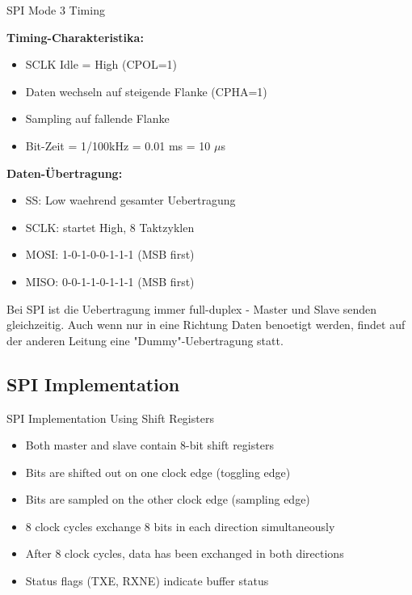 \begin{example2}{SPI Mode 3 Timing}
    \begin{minipage}{0.5\linewidth}
        \textbf{Timing-Charakteristika:}
    \begin{itemize}
        \item SCLK Idle = High (CPOL=1)
        \item Daten wechseln auf steigende Flanke (CPHA=1)
        \item Sampling auf fallende Flanke
        \item Bit-Zeit = 1/100kHz = 0.01 ms = 10 $\mu$s
    \end{itemize}
    \end{minipage}
    \begin{minipage}{0.5\linewidth}
        \textbf{Daten-Übertragung:}
    \begin{itemize}
        \item SS: Low waehrend gesamter Uebertragung
        \item SCLK: startet High, 8 Taktzyklen
        \item MOSI: 1-0-1-0-0-1-1-1 (MSB first)
        \item MISO: 0-0-1-1-0-1-1-1 (MSB first)
    \end{itemize}
    \end{minipage}
\end{example2}

\begin{remark}
    Bei SPI ist die Uebertragung immer full-duplex - Master und Slave senden gleichzeitig. Auch wenn nur in eine Richtung Daten benoetigt werden, findet auf der anderen Leitung eine "Dummy"-Uebertragung statt.
\end{remark}









\subsection{SPI Implementation}


\begin{concept}{SPI Implementation Using Shift Registers}
\begin{itemize}
    \item Both master and slave contain 8-bit shift registers
    \item Bits are shifted out on one clock edge (toggling edge)
    \item Bits are sampled on the other clock edge (sampling edge)
    \item 8 clock cycles exchange 8 bits in each direction simultaneously
    \item After 8 clock cycles, data has been exchanged in both directions
    \item Status flags (TXE, RXNE) indicate buffer status
\end{itemize}
\end{concept}

